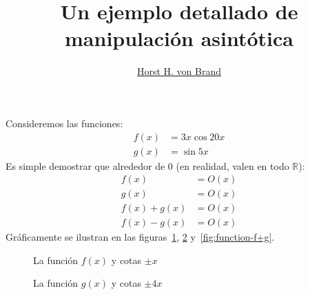 \documentclass[spanish, fleqn]{article}
\title{Un ejemplo detallado de manipulación asintótica}
\author{\href{mailto:vonbrand@inf.utfsm.cl}{Horst H. von Brand}}
\begin{document}


\maketitle
\thispagestyle{empty}

  Consideremos las funciones:
  \begin{align*}
    f(x)
      &= 3 x \cos 20 x \\
    g(x)
      &= \sin 5 x
  \end{align*}
  Es simple demostrar que alrededor de \(0\)
  (en realidad,
   valen en todo \(\mathbb{R}\)):
  \begin{align*}
    f(x)
      &= O(x)  \\
    g(x)
      &= O(x) \\
    f(x) + g(x)
      &= O(x) \\
    f(x) - g(x)
      &= O(x)
  \end{align*}
  Gráficamente se ilustran en las figuras~\ref{fig:function-f},
  \ref{fig:function-g}
  y~\ref{fig:function-f+g}.
  \begin{figure}[ht]
    \centering
    \caption{La función \(f(x)\) y cotas \(\pm x\)}
    \label{fig:function-f}
  \end{figure}
  \begin{figure}[ht]
    \centering
    \caption{La función \(g(x)\) y cotas \(\pm 4 x\)}
    \label{fig:function-g}
  \end{figure}
\end{document}
